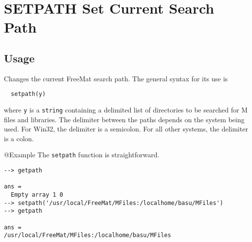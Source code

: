 \section{SETPATH Set Current Search Path}

\subsection{Usage}

Changes the current FreeMat search path.  The general syntax for
its use is
\begin{verbatim}
  setpath(y)
\end{verbatim}
where \verb|y| is a \verb|string| containing a delimited list of directories
to be searched for M files and libraries.  
The delimiter between the paths depends on the system being used.  For Win32, the
delimiter is a semicolon.  For all other systems, the delimiter is a colon.

@Example
The \verb|setpath| function is straightforward.
\begin{verbatim}
--> getpath

ans = 
  Empty array 1 0
--> setpath('/usr/local/FreeMat/MFiles:/localhome/basu/MFiles')
--> getpath

ans = 
/usr/local/FreeMat/MFiles:/localhome/basu/MFiles
\end{verbatim}
